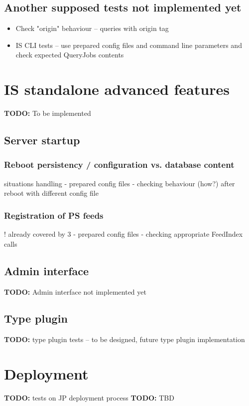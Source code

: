 \documentclass{egee}
\def\todo#1{\textbf{TODO:} #1}
\begin{document}
\subsection{Another supposed tests not implemented yet}

\begin{itemize}
 \item Check "origin" behaviour -- queries with origin tag
 \item IS CLI tests -- use prepared config files and command line parameters
  and check expected QueryJobs contents
\end{itemize}


\section{IS standalone advanced features}
\todo{To be implemented}

\subsection{Server startup}

\subsubsection{Reboot persistency / configuration vs. database content}
    situations handling
- prepared config files
- checking behaviour (how?) after reboot with different config file

\subsubsection{Registration of PS feeds}
! already covered by 3
- prepared config files
- checking appropriate FeedIndex calls

\subsection{Admin interface}
\todo{Admin interface not implemented yet}

\subsection{Type plugin}
\todo{type plugin tests -- to be designed, future type plugin implementation}

\section{Deployment}
\todo{tests on JP deployment process}
\todo{TBD}
\end{document}
